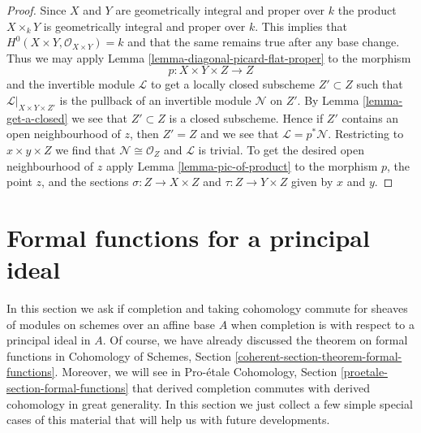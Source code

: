 \begin{proof}
Since $X$ and $Y$ are geometrically integral and proper over $k$
the product $X \times_k Y$ is geometrically integral and proper over $k$.
This implies that $H^0(X \times Y, \mathcal{O}_{X \times Y}) = k$
and that the same remains true after any base change.
Thus we may apply Lemma \ref{lemma-diagonal-picard-flat-proper}
to the morphism
$$
p : X \times Y \times Z \longrightarrow Z
$$
and the invertible module $\mathcal{L}$ to get a locally closed
subscheme $Z' \subset Z$ such that $\mathcal{L}|_{X \times Y \times Z'}$
is the pullback of an invertible module $\mathcal{N}$ on $Z'$. By
Lemma \ref{lemma-get-a-closed}
we see that $Z' \subset Z$ is a closed subscheme.
Hence if $Z'$ contains an open neighbourhood of $z$, then
$Z' = Z$ and we see that $\mathcal{L} = p^*\mathcal{N}$.
Restricting to $x \times y \times Z$ we find that
$\mathcal{N} \cong \mathcal{O}_Z$ and $\mathcal{L}$ is trivial.
To get the desired open neighbourhood of $z$ apply
Lemma \ref{lemma-pic-of-product}
to the morphism $p$, the point $z$, and the sections
$\sigma : Z \to X \times Z$ and $\tau : Z \to Y \times Z$ given by $x$ and $y$.
\end{proof}










\section{Formal functions for a principal ideal}
\label{section-formal-functions}

\noindent
In this section we ask if completion and taking cohomology commute
for sheaves of modules on schemes over an affine base $A$ when completion
is with respect to a principal ideal in $A$. Of course, we have already
discussed the theorem on formal functions in
Cohomology of Schemes, Section \ref{coherent-section-theorem-formal-functions}.
Moreover, we will see in
Pro-\'etale Cohomology, Section \ref{proetale-section-formal-functions}
that derived completion commutes with derived cohomology in great generality.
In this section we just collect a few simple special cases of this material
that will help us with future developments.

